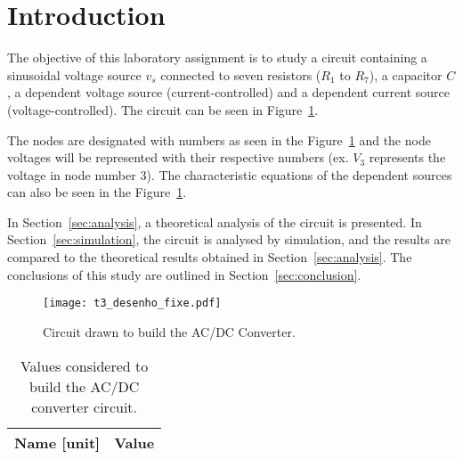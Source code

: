 \newpage
\section{Introduction}
\label{sec:introduction}

The objective of this laboratory assignment is to study a circuit containing a
sinusoidal voltage source $v_s$ connected to seven resistors ($R_1$ to $R_7$), a capacitor $C$, a dependent voltage source (current-controlled) and a dependent current source (voltage-controlled).
The circuit can be seen in Figure~\ref{fig:t2}.

The nodes are designated with numbers as seen in the Figure~\ref{fig:t2} and the node voltages will be represented with their respective numbers (ex. $V_3$ represents the voltage in node number 3). The characteristic equations of the dependent sources can also be seen in the Figure~\ref{fig:t2}. 




In Section~\ref{sec:analysis}, a theoretical analysis of the circuit is
presented. In Section~\ref{sec:simulation}, the circuit is analysed by
simulation, and the results are compared to the theoretical results obtained in
Section~\ref{sec:analysis}. The conclusions of this study are outlined in
Section~\ref{sec:conclusion}.

\begin{figure}[H] \centering
\texttt{[image: t3\_desenho\_fixe.pdf]}
\vspace{-10cm}
\caption{Circuit drawn to build the AC/DC Converter.}
\label{fig:t2}
\end{figure}

\vspace{1.5cm}
\begin{table}[H]
  \centering
  \begin{tabular}{|l|r|}
    \hline    
    {\bf Name [unit]} & {\bf Value} \\ \hline
    
  \end{tabular}
  \caption{Values considered to build the AC/DC converter circuit.}
  \label{tab:values}
\end{table}

